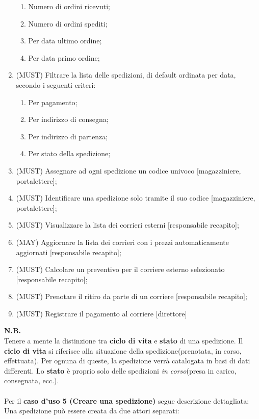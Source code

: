 \documentclass[a4paper,12pt]{article}
\begin{document}
\begin{enumerate}
\begin{enumerate}
      \item{Numero di ordini ricevuti};
      \item{Numero di ordini spediti};
      \item{Per data ultimo ordine};
      \item{Per data primo ordine};
    \end{enumerate}
  \item{(MUST)} Filtrare la lista delle spedizioni, di default ordinata per data, secondo i seguenti criteri:
    \begin{enumerate}
      \item{Per pagamento};
      \item{Per indirizzo di consegna};
      \item{Per indirizzo di partenza};
      \item{Per stato della spedizione};
    \end{enumerate}
  \item{(MUST)} Assegnare ad ogni spedizione un codice univoco [magazziniere, portalettere];
  \item{(MUST)} Identificare una spedizione solo tramite il suo codice [magazziniere, portalettere];
  \item{(MUST)} Visualizzare la lista dei corrieri esterni [responsabile recapito];
  \item{(MAY)}  Aggiornare la lista dei corrieri con i prezzi automaticamente aggiornati [responsabile recapito];
  \item{(MUST)} Calcolare un preventivo per il corriere esterno selezionato [responsabile recapito];
  \item{(MUST)} Prenotare il ritiro da parte di un corriere [responsabile recapito];
  \item{(MUST)} Registrare il pagamento al corriere [direttore]
\end{enumerate}
\textbf{N.B.} \\
Tenere a mente la distinzione tra \textbf{ciclo di vita} e \textbf{stato} di una spedizione. Il \textbf{ciclo di vita} si riferisce
alla situazione della spedizione(prenotata, in corso, effettuata). Per ognuna di queste, la spedizione verrà catalogata in basi di dati differenti.
Lo \textbf{stato} è proprio solo delle spedizioni \textit{in corso}(presa in carico, consegnata, ecc.).
\\ \\
Per il \textbf{caso d'uso 5 (Creare una spedizione)} segue descrizione dettagliata: \\
Una spedizione può essere creata da due attori separati:
\end{document}
